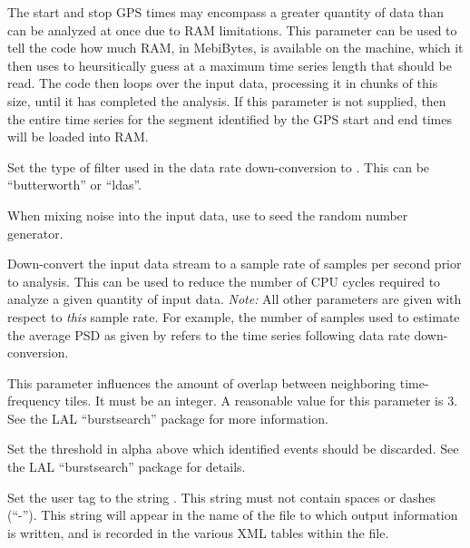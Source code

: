 \begin{entry}
\begin{entry}
\item[\option{--ram-limit} \parm{MebiBytes}]
The start and stop GPS times may encompass a greater quantity of data than
can be analyzed at once due to RAM limitations.  This parameter can be used
to tell the code how much RAM, in MebiBytes, is available on the machine,
which it then uses to heursitically guess at a maximum time series length
that should be read.  The code then loops over the input data, processing
it in chunks of this size, until it has completed the analysis.  If this
parameter is not supplied, then the entire time series for the segment
identified by the GPS start and end times will be loaded into RAM.

\item[\option{--resample-filter} \parm{filter type}]
Set the type of filter used in the data rate down-conversion to
.  This can be ``butterworth'' or ``ldas''.

\item[\option{--seed} \parm{seed}]
When mixing noise into the input data, use  to seed the random
number generator.

\item[\option{--target-sample-rate} \parm{Hz}]
Down-convert the input data stream to a sample rate of  samples
per second prior to analysis.  This can be used to reduce the number of CPU
cycles required to analyze a given quantity of input data.  \emph{Note:}
All other parameters are given with respect to \emph{this} sample rate.
For example, the number of samples used to estimate the average PSD as
given by  refers to the time series following
data rate down-conversion.

\item[\option{--tile-overlap-factor} \parm{factor}]
This parameter influences the amount of overlap between neighboring
time-frequency tiles.  It must be an integer.  A reasonable value for this
parameter is 3.  See the LAL ``burstsearch'' package for more information.

\item[\option{--threshold} \parm{threshold}]
Set the threshold in alpha above which identified events should be
discarded.  See the LAL ``burstsearch'' package for details.

\item[\option{--user-tag} \parm{comment}]
Set the user tag to the string .  This string must not
contain spaces or dashes (``-'').  This string will appear in the name of
the file to which output information is written, and is recorded in the
various XML tables within the file.


\end{entry}
\end{entry}
